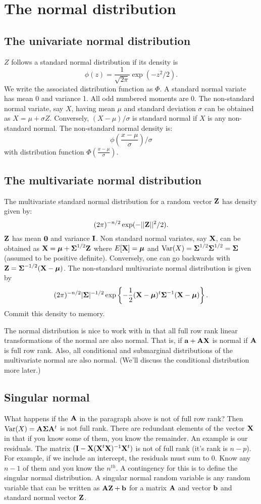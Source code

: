 \chapter{The normal distribution}

\section{The univariate normal distribution}
$Z$ follows a standard normal distribution if its
density is 
$$
\phi(z) = \frac{1}{\sqrt{2\pi}} \exp(-z^2/2).
$$
We write the associated distribution function as $\Phi$. 
A standard normal variate has mean 0 and variance 1. 
All odd numbered moments are 0. The non-standard
normal variate, say $X$, having mean $\mu$ 
and standard deviation $\sigma$ can be obtained
as $X = \mu + \sigma Z$. Conversely, 
$(X - \mu) / \sigma$ is standard normal if
$X$ is any non-standard normal. The
non-standard normal density is:
$$
\phi\left( \frac{x - \mu}{\sigma}\right) /\sigma
$$
with distribution function $\Phi\left( \frac{x - \mu}{\sigma}\right)$.

\section{The multivariate normal distribution}

The multivariate standard normal distribution for a 
random vector $\mathbf{Z}$ has density given by:
$$
(2 \pi)^{-n/2} \exp( -||\mathbf{Z}||^2 / 2).
$$
$\mathbf{Z}$ has mean $\mathbf{0}$ and variance $\mathbf{I}$. Non standard
normal variates, say $\mathbf{X}$, can be obtained as 
$\mathbf{X} = \boldsymbol{\mu} + \boldsymbol{\Sigma}^{1/2} \mathbf{Z}$ where $E[\mathbf{X}] = \boldsymbol{\mu}$
and $\mbox{Var}(X) = \boldsymbol{\Sigma}^{1/2}\boldsymbol{\Sigma}^{1/2} = \boldsymbol{\Sigma}$ (assumed
to be positive definite). 
Conversely, one can go backwards with 
$\mathbf{Z} = \boldsymbol{\Sigma}^{-1/2} (\mathbf{X} - \boldsymbol{\mu})$. The non-standard
multivariate normal distribution is given by
$$
(2\pi)^{-n/2} |\boldsymbol{\Sigma}|^{-1/2} \exp\left\{ -\frac{1}{2}(\mathbf{X} - \boldsymbol{\mu})^t \boldsymbol{\Sigma}^{-1} (\mathbf{X} - \boldsymbol{\mu}) \right\}.
$$
Commit this density to memory. 

The normal distribution is nice to work with in that
all full row rank linear transformations of the normal are
also normal. That is, if $\mathbf{a} + \mathbf{A} \mathbf{X}$ is normal if $\mathbf{A}$ is
full row rank. Also, all conditional and submarginal distributions
of the multivariate normal are also normal. (We'll discuss the
conditional distribution more later.)

\section{Singular normal}
What happens if the $\mathbf{A}$ in the paragraph above is not of full
row rank? Then $\mbox{Var}(X) = \mathbf{A}\boldsymbol{\Sigma} \mathbf{A}^t$ is not full rank.
There are redundant elements of the vector $\mathbf{X}$ in that if
you know some of them, you know the remainder. An example is
our residuals. The matrix $(\mathbf{I} - \mathbf{X} (\mathbf{X}^t \mathbf{X})^{-1} \mathbf{X}^t)$ is not of full
rank (it's rank is $n-p$). For example, if we include an
intercept, the residuals must sum to 0. Know any $n-1$ of
them and you know the $n^{th}$. A contingency for this
is to define the singular normal distribution. A
singular normal random variable is any random variable
that can be written as $\mathbf{A} \mathbf{Z} + \mathbf{b}$ for a matrix $\mathbf{A}$
and vector $\mathbf{b}$ and standard normal vector $\mathbf{Z}$. 

